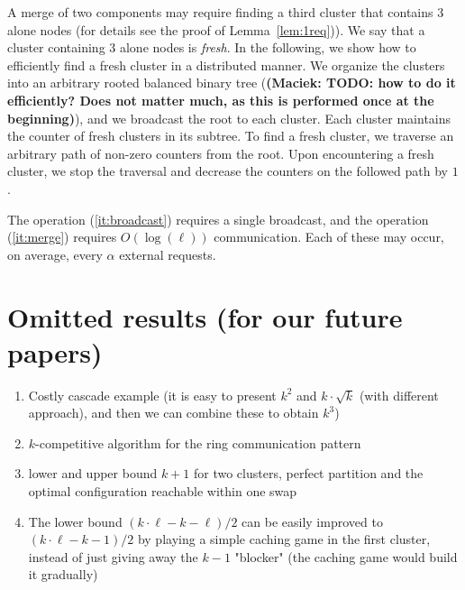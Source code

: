 \documentclass[manuscript,screen=true, review, anonymous]{acmart}
\newcommand\maciek[1]{\color{brown}\textbf{(Maciek: #1)}\color{black}}
\begin{document}
A merge of two components may require finding a third cluster that contains $3$ alone nodes (for details see the proof of Lemma~\ref{lem:1req})).
We say that a cluster containing $3$ alone nodes is \emph{fresh}.
In the following, we show how to efficiently find a fresh cluster in a distributed manner.
We organize the clusters into an arbitrary rooted balanced binary tree (\maciek{TODO: how to do it efficiently? Does not matter much, as this is performed once at the beginning}), and we broadcast the root to each cluster.
Each cluster maintains the counter of fresh clusters in its subtree.
To find a fresh cluster, we traverse an arbitrary path of non-zero counters from the root.
Upon encountering a fresh cluster, we stop the traversal and decrease the counters on the followed path by $1$.

The operation (\ref{it:broadcast}) requires a single broadcast, and the operation (\ref{it:merge}) requires $O(\log(\ell))$ communication.
Each of these may occur, on average, every $\alpha$ external requests.



  

\appendix


\section{Omitted results (for our future papers)}

\begin{enumerate}
	\item Costly cascade example (it is easy to present $k^2$ and $k\cdot \sqrt{k}$ (with different approach), and then we can combine these to obtain $k^3$)
	
	\item $k$-competitive algorithm for the ring communication pattern
	
	\item lower and upper bound $k+1$ for two clusters, perfect partition and the optimal configuration reachable within one swap
	
	\item The lower bound $(k \cdot \ell - k - \ell) / 2$ can be easily improved to $(k \cdot \ell - k - 1) / 2$ by playing a simple caching game in the first cluster, instead of just giving away the $k-1$ "blocker" (the caching game would build it gradually)
	
\end{enumerate}
\end{document}
